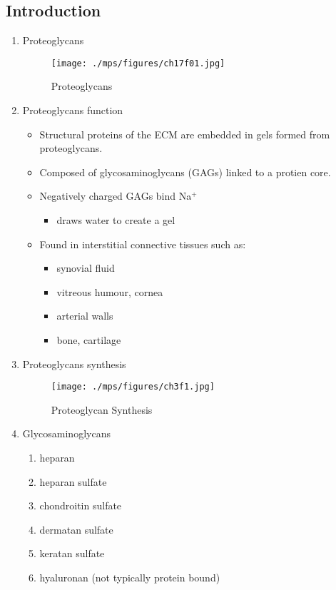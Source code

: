 \documentclass{scrartcl}
\begin{document}
\subsection{Introduction}
\label{sec:org41eb49b}
\begin{enumerate}
\item Proteoglycans
\label{sec:org0a4dd66}

\begin{figure}[htbp]
\centering
\texttt{[image: ./mps/figures/ch17f01.jpg]}
\caption[Proteoglycans]{\label{fig:org64c2169}
Proteoglycans}
\end{figure}

\item Proteoglycans function
\label{sec:org744e746}

\begin{itemize}
\item Structural proteins of the ECM are embedded in gels formed from
proteoglycans.
\item Composed of glycosaminoglycans (GAGs) linked to a protien core.
\item Negatively charged GAGs bind Na\(^{\text{+}}\)
\begin{itemize}
\item draws water to create a gel
\end{itemize}
\item Found in interstitial connective tissues such as: 
\begin{itemize}
\item synovial fluid
\item vitreous humour, cornea
\item arterial walls
\item bone, cartilage
\end{itemize}
\end{itemize}

\item Proteoglycans synthesis
\label{sec:orgaf9e2fe}

\begin{figure}[htbp]
\centering
\texttt{[image: ./mps/figures/ch3f1.jpg]}
\caption[Proteoglycan Synthesis]{\label{fig:orgd7d7a93}
Proteoglycan Synthesis}
\end{figure}


\item Glycosaminoglycans
\label{sec:orgbf82e93}

\begin{enumerate}
\item heparan
\item heparan sulfate
\item chondroitin sulfate
\item dermatan sulfate
\item keratan sulfate
\item hyaluronan (not typically protein bound)
\end{enumerate}



\end{enumerate}
\end{document}
